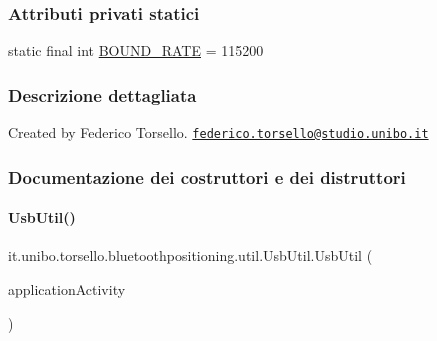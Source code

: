 \subsubsection*{Attributi privati statici}
\begin{DoxyCompactItemize}
\item 
static final int \hyperlink{classit_1_1unibo_1_1torsello_1_1bluetoothpositioning_1_1util_1_1UsbUtil_aec0f258e676be1d17b57b0df94aeeb79_aec0f258e676be1d17b57b0df94aeeb79}{B\+O\+U\+N\+D\+\_\+\+R\+A\+TE} = 115200
\end{DoxyCompactItemize}


\subsubsection{Descrizione dettagliata}
Created by Federico Torsello. \href{mailto:federico.torsello@studio.unibo.it}{\tt federico.\+torsello@studio.\+unibo.\+it} 

\subsubsection{Documentazione dei costruttori e dei distruttori}
\hypertarget{classit_1_1unibo_1_1torsello_1_1bluetoothpositioning_1_1util_1_1UsbUtil_aff938c0dddb8fd4549b0a3dddba94473_aff938c0dddb8fd4549b0a3dddba94473}{}\label{classit_1_1unibo_1_1torsello_1_1bluetoothpositioning_1_1util_1_1UsbUtil_aff938c0dddb8fd4549b0a3dddba94473_aff938c0dddb8fd4549b0a3dddba94473} 
\paragraph{\texorpdfstring{Usb\+Util()}{UsbUtil()}}
{\footnotesize\ttfamily it.\+unibo.\+torsello.\+bluetoothpositioning.\+util.\+Usb\+Util.\+Usb\+Util (\begin{DoxyParamCaption}\item[{\hyperlink{classit_1_1unibo_1_1torsello_1_1bluetoothpositioning_1_1activities_1_1ApplicationActivity}{Application\+Activity}}]{application\+Activity }\end{DoxyParamCaption})}


